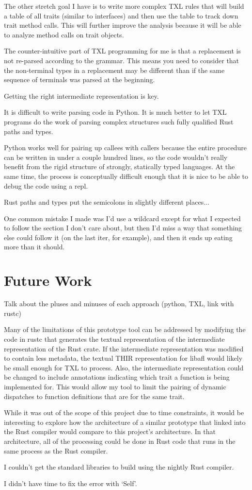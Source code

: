 \documentclass[11pt]{article}
\begin{document}
The other stretch goal I have is to write more complex TXL rules that will build a table of all traits (similar to interfaces) and then use the table to track down trait method calls.
This will further improve the analysis because it will be able to analyze method calls on trait objects.

The counter-intuitive part of TXL programming for me is that a replacement is not re-parsed according to the grammar.
This means you need to consider that the non-terminal types in a replacement may be different than if the same sequence of terminals was parsed at the beginning.

Getting the right intermediate representation is key.

It is difficult to write parsing code in Python.
It is much better to let TXL programs do the work of parsing complex structures such fully qualified Rust paths and types.

Python works well for pairing up callees with callers because the entire procedure can be written in under a couple hundred lines, so the code wouldn't really benefit from the rigid structure of strongly, statically typed languages.
At the same time, the process is conceptually difficult enough that it is nice to be able to debug the code using a repl.

Rust paths and types put the semicolons in slightly different places...

One common mistake I made was I'd use a wildcard except for what I expected to follow the section I don't care about, but then I'd miss a way that something else could follow it (on the last iter, for example), and then it ends up eating more than it should.

\section{Future Work}

Talk about the pluses and minuses of each approach (python, TXL, link with rustc)

Many of the limitations of this prototype tool can be addressed by modifying the code in rustc that generates the textual representation of the intermediate representation of the Rust crate.
If the intermediate representation was modified to contain less metadata, the textual THIR representation for libafl would likely be small enough for TXL to process.
Also, the intermediate representation could be changed to include annotations indicating which trait a function is being implemented for.
This would allow my tool to limit the pairing of dynamic dispatches to function definitions that are for the same trait.

While it was out of the scope of this project due to time constraints, it would be interesting to explore how the architecture of a similar prototype that linked into the Rust compiler would compare to this project's architecture.
In that architecture, all of the processing could be done in Rust code that runs in the same process as the Rust compiler.

I couldn't get the standard libraries to build using the nightly Rust compiler.

I didn't have time to fix the error with `Self'.
\end{document}
